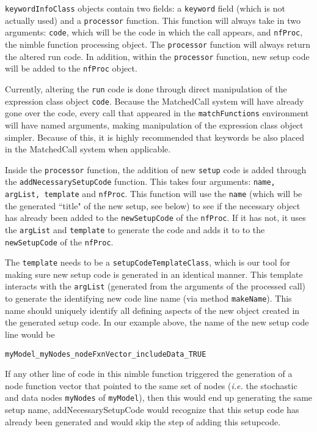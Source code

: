 \documentclass[11pt]{article}
\numberwithin{equation}{section}
\begin{document}
	\texttt{keywordInfoClass} objects contain two fields: a \texttt{keyword} field (which is not actually used) and a \texttt{processor} function. This function will always take in two arguments: \texttt{code}, which will be the code in which the call appears, and \texttt{nfProc}, the nimble function processing object. The \texttt{processor} function will always return the altered run code. In addition, within the \texttt{processor} function, new setup code will be added to the \texttt{nfProc} object. 
	
	Currently, altering the \texttt{run} code is done through direct manipulation of the expression class object \texttt{code}. Because the MatchedCall system will have already gone over the code, every call that appeared in the  \texttt{matchFunctions} environment will have named arguments, making manipulation of the expression class object simpler. Because of this, it is highly recommended that keywords be also placed in the MatchedCall system when applicable. 
	
	Inside the \texttt{processor} function, the addition of new \texttt{setup} code is added through the \texttt{addNecessarySetupCode} function. This takes four arguments: \texttt{name, argList, template} and \texttt{nfProc}. This function will use the \texttt{name} (which will be the generated ``title" of the new setup, see below) to see if the necessary object has already been added to the \texttt{newSetupCode} of the \texttt{nfProc}. If it has not, it uses the \texttt{argList} and \texttt{template} to generate the code and adds it to to the \texttt{newSetupCode} of the \texttt{nfProc}. 
	
	The \texttt{template} needs to be a \texttt{setupCodeTemplateClass}, which is our tool for making sure new setup code is generated in an identical manner. This template interacts with the \texttt{argList} (generated from the arguments of the processed call) to generate the identifying new code line name (via method \texttt{makeName}). This name should uniquely identify all defining aspects of the new object created in the generated setup code. In our example above, the name of the new setup code line would be 
	
	\texttt{myModel\_myNodes\_nodeFxnVector\_includeData\_TRUE}
	
	If any other line of  code in this nimble function triggered the generation of a node function vector that pointed to the same set of nodes (\emph{i.e.} the stochastic and data nodes \texttt{myNodes} of \texttt{myModel}), then this would end up generating the same setup name, addNecessarySetupCode would recognize that this setup code has already been generated and would skip the step of adding this setupcode.  
	
\end{document}
